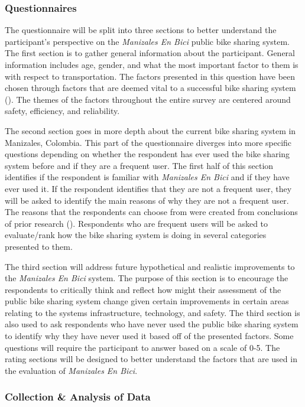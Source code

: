 \documentclass[12pt]{article}
\begin{document}
\subsubsection*{Questionnaires}

The questionnaire will be split into three sections to better understand the participant’s perspective on the \textit{Manizales En Bici} public bike sharing system. The first section is to gather general information about the participant. General information includes age, gender, and what the most important factor to them is with respect to transportation. The factors presented in this question have been chosen through factors that are deemed vital to a successful bike sharing system (\cite{midgley_2011}). The themes of the factors throughout the entire survey are centered around safety, efficiency, and reliability. 

The second section goes in more depth about the current bike sharing system in Manizales, Colombia. This part of the questionnaire diverges into more specific questions depending on whether the respondent has ever used the bike sharing system before and if they are a frequent user. The first half of this section identifies if the respondent is familiar with \textit{Manizales En Bici} and if they have ever used it. If the respondent identifies that they are not a frequent user, they will be asked to identify the main reasons of why they are not a frequent user. The reasons that the respondents can choose from were created from conclusions of prior research (\cite{ReviewonBike-sharing}). Respondents who are frequent users will be asked to evaluate/rank how the bike sharing system is doing in several categories presented to them. 

The third section will address future hypothetical and realistic improvements to the \textit{Manizales En Bici} system. The purpose of this section is to encourage the respondents to critically think and reflect how might their assessment of the public bike sharing system change given certain improvements in certain areas relating to the systems infrastructure, technology, and safety. The third section is also used to ask respondents who have never used the public bike sharing system to identify why they have never used it based off of the presented factors. Some questions will require the participant to answer based on a scale of 0-5. The rating sections will be designed to better understand the factors that are used in the evaluation of \textit{Manizales En Bici}.

\subsubsection*{Collection \& Analysis of Data}
\end{document}
